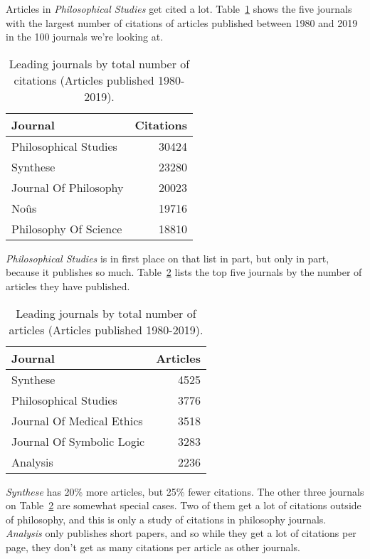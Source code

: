 \documentclass[
  10pt,
  letterpaper,
  DIV=11,
  numbers=noendperiod,
  twoside]{scrartcl}
\begin{document}
Articles in \emph{Philosophical Studies} get cited a lot.
Table~\ref{tbl-all-cites} shows the five journals with the largest
number of citations of articles published between 1980 and 2019 in the
100 journals we're looking at.

\begin{longtable}[]{@{}lr@{}}

\caption{\label{tbl-all-cites}Leading journals by total number of
citations (Articles published 1980-2019).}

\tabularnewline

\toprule\noalign{}
Journal & Citations \\
\midrule\noalign{}
\endhead
\bottomrule\noalign{}
\endlastfoot
Philosophical Studies & 30424 \\
Synthese & 23280 \\
Journal Of Philosophy & 20023 \\
Noûs & 19716 \\
Philosophy Of Science & 18810 \\

\end{longtable}

\emph{Philosophical Studies} is in first place on that list in part, but
only in part, because it publishes so much. Table~\ref{tbl-all-articles}
lists the top five journals by the number of articles they have
published.

\begin{longtable}[]{@{}lr@{}}

\caption{\label{tbl-all-articles}Leading journals by total number of
articles (Articles published 1980-2019).}

\tabularnewline

\toprule\noalign{}
Journal & Articles \\
\midrule\noalign{}
\endhead
\bottomrule\noalign{}
\endlastfoot
Synthese & 4525 \\
Philosophical Studies & 3776 \\
Journal Of Medical Ethics & 3518 \\
Journal Of Symbolic Logic & 3283 \\
Analysis & 2236 \\

\end{longtable}

\emph{Synthese} has 20\% more articles, but 25\% fewer citations. The
other three journals on Table~\ref{tbl-all-articles} are somewhat
special cases. Two of them get a lot of citations outside of philosophy,
and this is only a study of citations in philosophy journals.
\emph{Analysis} only publishes short papers, and so while they get a lot
of citations per page, they don't get as many citations per article as
other journals.
\end{document}
